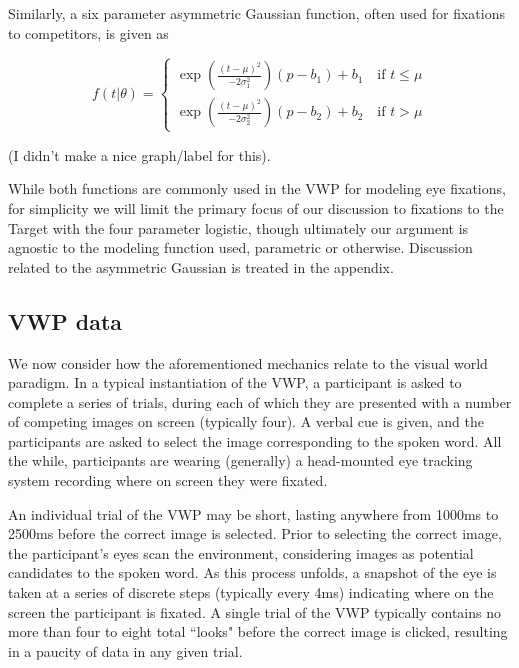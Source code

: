 Similarly, a six parameter asymmetric Gaussian function, often used for fixations to competitors, is given as

\begin{equation} \label{eq:dg}
f(t|\theta) = \begin{cases}
\exp \left( \frac{(t - \mu)^2}{-2\sigma_1^2} \right) (p - b_1) + b_1 \quad \text{if } t \leq \mu \\
\exp \left( \frac{(t - \mu)^2}{-2\sigma_2^2} \right) (p - b_2) + b_2 \quad \text{if } t > \mu
\end{cases}
\end{equation}

(I didn't make a nice graph/label for this). 

While both functions are commonly used in the VWP for modeling eye fixations, for simplicity we will limit the primary focus of our discussion to fixations to the Target with the four parameter logistic, though ultimately our argument is agnostic to the modeling function used, parametric or otherwise. Discussion related to the asymmetric Gaussian is treated in the appendix.


\subsection{VWP data}


We now consider how the aforementioned mechanics relate to the visual world paradigm. In a typical instantiation of the VWP, a participant is asked to complete a series of trials, during each of which they are presented with a number of competing images on screen (typically four). A verbal cue is given, and the participants are asked to select the image corresponding to the spoken word. All the while, participants are wearing (generally) a head-mounted eye tracking system recording where on screen they were fixated. 

An individual trial of the VWP may be short, lasting anywhere from 1000ms to 2500ms before the correct image is selected. Prior to selecting the correct image, the participant's eyes scan the environment, considering images as potential candidates to the spoken word. As this process unfolds, a snapshot of the eye is taken at a series of discrete steps (typically every 4ms) indicating where on the screen the participant is fixated. A single trial of the VWP typically contains no more than four to eight total ``looks" before the correct image is clicked, resulting in a paucity of data in any given trial.

